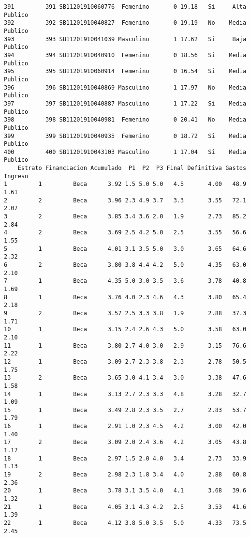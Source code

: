 \documentclass[
  letterpaper,
  DIV=11,
  numbers=noendperiod]{scrartcl}
\begin{document}
\begin{verbatim}
391         391 SB11201910060776  Femenino       0 19.18   Si     Alta Publico
392         392 SB11201910040827  Femenino       0 19.19   No    Media Publico
393         393 SB11201910041039 Masculino       1 17.62   Si     Baja Publico
394         394 SB11201910040910  Femenino       0 18.56   Si    Media Publico
395         395 SB11201910060914  Femenino       0 16.54   Si    Media Publico
396         396 SB11201910040869 Masculino       1 17.97   No    Media Publico
397         397 SB11201910040887 Masculino       1 17.22   Si    Media Publico
398         398 SB11201910040981  Femenino       0 20.41   No    Media Publico
399         399 SB11201910040935  Femenino       0 18.72   Si    Media Publico
400         400 SB11201910043103 Masculino       1 17.04   Si    Media Publico
    Estrato Financiacion Acumulado  P1  P2  P3 Final Definitiva Gastos Ingreso
1         1         Beca      3.92 1.5 5.0 5.0   4.5       4.00   48.9    1.61
2         2         Beca      3.96 2.3 4.9 3.7   3.3       3.55   72.1    2.07
3         2         Beca      3.85 3.4 3.6 2.0   1.9       2.73   85.2    2.84
4         2         Beca      3.69 2.5 4.2 5.0   2.5       3.55   56.6    1.55
5         1         Beca      4.01 3.1 3.5 5.0   3.0       3.65   64.6    2.32
6         2         Beca      3.80 3.8 4.4 4.2   5.0       4.35   63.0    2.10
7         1         Beca      4.35 5.0 3.0 3.5   3.6       3.78   40.8    1.69
8         1         Beca      3.76 4.0 2.3 4.6   4.3       3.80   65.4    2.18
9         2         Beca      3.57 2.5 3.3 3.8   1.9       2.88   37.3    1.71
10        1         Beca      3.15 2.4 2.6 4.3   5.0       3.58   63.0    2.10
11        1         Beca      3.80 2.7 4.0 3.0   2.9       3.15   76.6    2.22
12        1         Beca      3.09 2.7 2.3 3.8   2.3       2.78   50.5    1.75
13        2         Beca      3.65 3.0 4.1 3.4   3.0       3.38   47.6    1.58
14        1         Beca      3.13 2.7 2.3 3.3   4.8       3.28   32.7    1.09
15        1         Beca      3.49 2.8 2.3 3.5   2.7       2.83   53.7    1.79
16        1         Beca      2.91 1.0 2.3 4.5   4.2       3.00   42.0    1.40
17        2         Beca      3.09 2.0 2.4 3.6   4.2       3.05   43.8    1.17
18        1         Beca      2.97 1.5 2.0 4.0   3.4       2.73   33.9    1.13
19        2         Beca      2.98 2.3 1.8 3.4   4.0       2.88   60.8    2.36
20        1         Beca      3.78 3.1 3.5 4.0   4.1       3.68   39.6    1.32
21        1         Beca      4.05 3.1 4.3 4.2   2.5       3.53   41.6    1.39
22        1         Beca      4.12 3.8 5.0 3.5   5.0       4.33   73.5    2.45

\end{verbatim}
\end{document}
